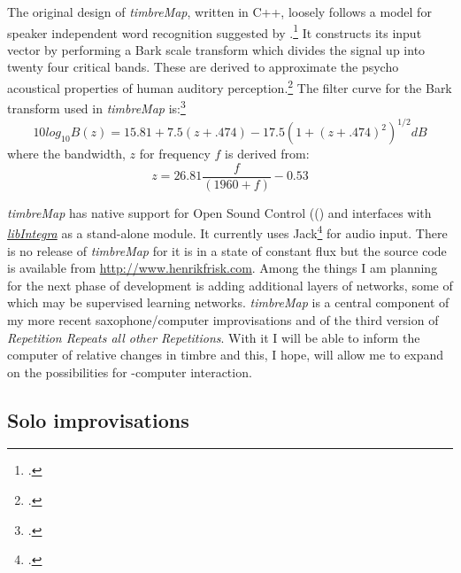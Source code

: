 The original design of \emph{timbreMap}, written in C++, loosely follows a model for speaker independent word recognition suggested by \citeauthor{huang92}.\footcite{huang92} It constructs its input vector by performing a Bark scale transform which divides the signal up into twenty four critical bands. These are derived to approximate the psycho acoustical properties of human auditory perception.\footcite[See][]{bladon86} The filter curve for the Bark transform used in \emph{timbreMap} is:\footcite[Following][32--3]{bladon86}
\begin{equation}
  \label{eq:4}
  10log_{10}B(z) = 15.81+7.5(z+.474)-17.5(1+(z+.474)^2)^{1/2}dB
\end{equation}
where the bandwidth, $z$ for frequency $f$ is derived from: 
\begin{equation}
  \label{eq:5}
  z=26.81\frac{f}{(1960+f)}-0.53
\end{equation}

\emph{timbreMap} has native support for Open Sound Control (() and interfaces with \hyperref[sec:libintegra]{\emph{libIntegra}} as a stand-alone module. It currently uses Jack\footcite{davis08} for audio input. There is no release of \emph{timbreMap} for it is in a state of constant flux but the source code is available from \url{http://www.henrikfrisk.com}. Among the things I am planning for the next phase of development is adding additional layers of networks, some of which may be supervised learning networks. \emph{timbreMap} is a central component of my more recent saxophone/computer improvisations and of the third version of \emph{Repetition Repeats all other Repetitions}. With it I will be able to inform the computer of relative changes in timbre and this, I hope, will allow me to expand on the possibilities for -computer interaction.

\newpage
\subsection{Solo improvisations}
\label{sec:solo-impr-2002}



